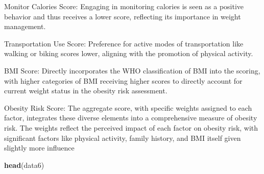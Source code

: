 \documentclass[
]{article}
\newenvironment{Shaded}{\begin{snugshade}}{\end{snugshade}}
\newcommand{\FunctionTok}[1]{\textcolor[rgb]{0.13,0.29,0.53}{\textbf{#1}}}
\newcommand{\NormalTok}[1]{#1}
\begin{document}
Monitor Calories Score: Engaging in monitoring calories is seen as a
positive behavior and thus receives a lower score, reflecting its
importance in weight management.

Transportation Use Score: Preference for active modes of transportation
like walking or biking scores lower, aligning with the promotion of
physical activity.

BMI Score: Directly incorporates the WHO classification of BMI into the
scoring, with higher categories of BMI receiving higher scores to
directly account for current weight status in the obesity risk
assessment.

Obesity Risk Score: The aggregate score, with specific weights assigned
to each factor, integrates these diverse elements into a comprehensive
measure of obesity risk. The weights reflect the perceived impact of
each factor on obesity risk, with significant factors like physical
activity, family history, and BMI itself given slightly more influence

\begin{Shaded}
\begin{Highlighting}[]
\FunctionTok{head}\NormalTok{(data6)}
\end{Highlighting}
\end{Shaded}
\end{document}

